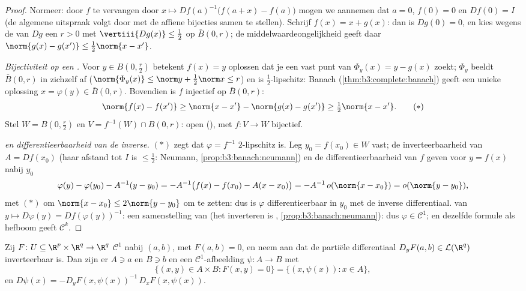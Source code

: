 \begin{proof}
Normeer: door $f$ te vervangen door $x \mapsto
Df(a)^{-1}\bigl(f(a + x) - f(a)\bigr)$ mogen we aannemen dat $a =
0$, $f(0) = 0$ en $Df(0) = I$ (de algemene uitspraak volgt door
met de affiene bijecties samen te stellen). Schrijf $f(x) = x +
g(x)$: dan is $Dg(0) = 0$, en kies wegens de  van
$Dg$ een $r > 0$ met $\vertiii{Dg(x)} \leq \frac12$ op $\bar B(0,
r)$; de middelwaardeongelijkheid geeft daar $\norm{g(x) - g(x')}
\leq \frac12 \norm{x - x'}$.

\emph{Bijectiviteit op een .} Voor $y \in B(0, \frac
r2)$ betekent $f(x) = y$ oplossen dat je een vast punt van
$\Phi_y(x) = y - g(x)$ zoekt; $\Phi_y$ beeldt $\bar B(0, r)$ in
zichzelf af ($\norm{\Phi_y(x)} \leq \norm y + \frac12\norm x \leq
r$) en is $\frac12$-lipschitz: Banach
(\cref{thm:b3:complete:banach}) geeft een unieke oplossing $x =
\varphi(y) \in \bar B(0,r)$. Bovendien is $f$ injectief op $\bar
B(0,r)$:
\[
\norm{f(x) - f(x')} \geq \norm{x - x'} - \norm{g(x) - g(x')}
\geq \tfrac12\norm{x - x'} .
\tag{$*$}
\]
Stel $W = B(0, \frac r2)$ en $V = f^{-1}(W)\cap B(0, r)$: open
(), met $f \colon V \to W$ bijectief.

\emph{ en differentieerbaarheid van de inverse.}
$(*)$ zegt dat $\varphi = f^{-1}$ $2$-lipschitz is. Leg $y_0 =
f(x_0) \in W$ vast; de inverteerbaarheid van $A = Df(x_0)$ (haar
afstand tot $I$ is $\leq \frac12$: Neumann,
\cref{prop:b3:banach:neumann}) en de differentieerbaarheid van
$f$ geven voor $y = f(x)$ nabij $y_0$
\[
\varphi(y) - \varphi(y_0) - A^{-1}(y - y_0)
= -A^{-1}\bigl(f(x) - f(x_0) - A(x - x_0)\bigr)
= -A^{-1}\,o(\norm{x - x_0}) = o(\norm{y - y_0}),
\]
met $(*)$ om $\norm{x - x_0} \leq 2\norm{y - y_0}$ om te zetten:
dus is $\varphi$ differentieerbaar in $y_0$ met de inverse
differentiaal.  van $y \mapsto D\varphi(y) =
Df(\varphi(y))^{-1}$: een samenstelling van  (het inverteren is ,
\cref{prop:b3:banach:neumann}): dus $\varphi \in \mathcal C^1$;
en dezelfde formule als hefboom geeft $\mathcal C^k$.
\end{proof}

\begin{theorem}
\label{thm:b3:submanifolds:implicit}
Zij $F \colon U \subseteq \R^p\times\R^q \to \R^q$ $\mathcal C^1$
nabij $(a, b)$, met $F(a,b) = 0$, en neem aan dat de partiële
differentiaal $D_yF(a,b) \in \mathcal L(\R^q)$ inverteerbaar is.
Dan zijn er  $A \ni a$ en $B \ni b$ en een $\mathcal
C^1$-afbeelding $\psi \colon A \to B$ met
\[
\bigl\{(x, y)\in A\times B : F(x,y) = 0\bigr\}
= \{(x, \psi(x)) : x \in A\},
\]
en $D\psi(x) = -D_yF(x, \psi(x))^{-1}\,D_xF(x,
\psi(x))$.
\end{theorem}

